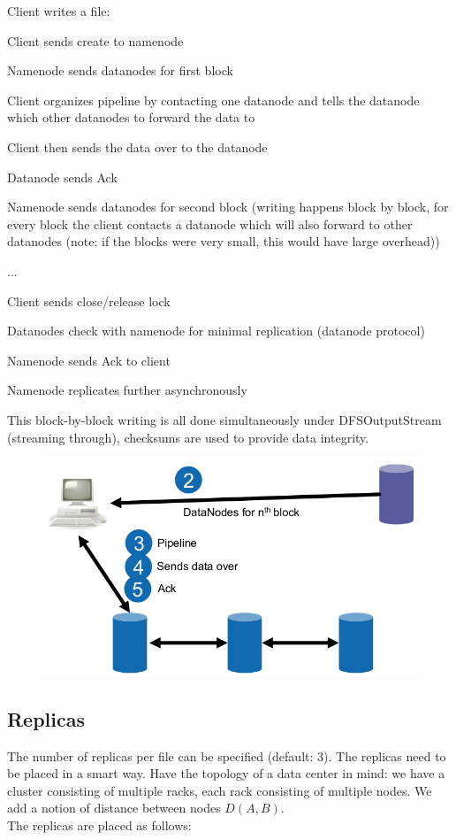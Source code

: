 \documentclass[11pt,oneside,a4paper]{article}
\begin{document}
Client writes a file:

\begin{compactenum}
	\item Client sends create to namenode
	\item Namenode sends datanodes for first block
	\item Client organizes pipeline by contacting one datanode and tells the datanode which other datanodes to forward the data to
	\item Client then sends the data over to the datanode
	\item Datanode sends Ack
	\item Namenode sends datanodes for second block (writing happens block by block, for every block the client contacts a datanode which will also forward to other datanodes (note: if the blocks were very small, this would have large overhead))
	\item ...
	\item Client sends close/release lock
	\item Datanodes check with namenode for minimal replication (datanode protocol)
	\item Namenode sends Ack to client
	\item Namenode replicates further asynchronously
\end{compactenum}

This block-by-block writing is all done simultaneously under DFSOutputStream (streaming through), checksums are used to provide data integrity.

\begin{figure}[hb!]
	\centering
	\includegraphics[width=0.4\linewidth]{figures/hdfs_client_write}
	\label{fig:hdfsclientwrite}
\end{figure}

\newpage

\subsection{Replicas}

The number of replicas per file can be specified (default: 3). The replicas need to be placed in a smart way. Have the topology of a data center in mind: we have a cluster consisting of multiple racks, each rack consisting of multiple nodes. We add a notion of distance between nodes $D(A,B)$.\\
The replicas are placed as follows:
\end{document}
